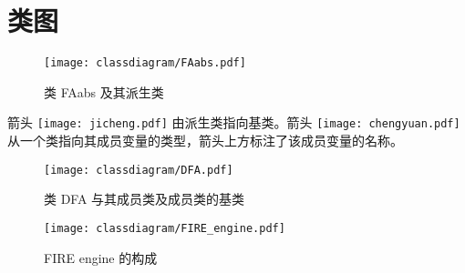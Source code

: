\chapter{类图}

\begin{figure}[!htbp]
    \centering
        \texttt{[image: classdiagram/FAabs.pdf]}
    \caption{类 FAabs 及其派生类}
    \label{fig:class-faabs}
\end{figure}

箭头 \texttt{[image: jicheng.pdf]} 由派生类指向基类。箭头 \texttt{[image: chengyuan.pdf]} 从一个类指向其成员变量的类型，箭头上方标注了该成员变量的名称。







\begin{figure}[!htbp]
    \centering
        \texttt{[image: classdiagram/DFA.pdf]}
    \caption{类 DFA 与其成员类及成员类的基类}
    \label{fig:class-dfa}
\end{figure}

\begin{figure}[!htbp]
    \centering
        \texttt{[image: classdiagram/FIRE\_engine.pdf]}
    \caption{FIRE engine 的构成}
    \label{fig:FIRE-engine}
\end{figure}